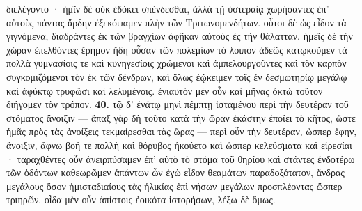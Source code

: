 \documentclass[a4paper, 11pt, oneside, polutonikogreek, german]{article}
\begin{document}
διελέγοντο · ἡμῖν δὲ οὐκ ἐδόκει σπένδεσθαι, ἀλλὰ τῇ ὑστεραίᾳ χωρήσαντες ἐπ' αὐτοὺς πάντας ἄρδην ἐξεκόψαμεν πλὴν τῶν Τριτωνομενδήτων. οὗτοι δὲ ὡς εἶδον τὰ γιγνόμενα, διαδράντες ἐκ τῶν βραγχίων ἀφῆκαν αὑτοὺς ἐς τὴν θάλατταν. ἡμεῖς δὲ τὴν χώραν ἐπελθόντες ἔρημον ἤδη οὖσαν τῶν πολεμίων τὸ λοιπὸν ἀδεῶς κατῳκοῦμεν τὰ πολλὰ γυμνασίοις τε καὶ κυνηγεσίοις χρώμενοι καὶ ἀμπελουργοῦντες καὶ τὸν καρπὸν συγκομιζόμενοι τὸν ἐκ τῶν δένδρων, καὶ ὅλως ἐῴκειμεν τοῖς ἐν δεσμωτηρίῳ μεγάλῳ καὶ ἀφύκτῳ τρυφῶσι καὶ λελυμένοις. ἐνιαυτὸν μὲν οὖν καὶ μῆνας ὀκτὼ τοῦτον διήγομεν τὸν τρόπον. \textbf{40.} τῷ δ' ἐνάτῳ μηνὶ πέμπτῃ ἱσταμένου περὶ τὴν δευτέραν τοῦ στόματος ἄνοιξιν --- ἄπαξ γὰρ δὴ τοῦτο κατὰ τὴν ὥραν ἑκάστην ἐποίει τὸ κῆτος, ὥστε ἡμᾶς πρὸς τὰς ἀνοίξεις τεκμαίρεσθαι τὰς ὥρας --- περὶ οὖν τὴν δευτέραν, ὥσπερ ἔφην, ἄνοιξιν, ἄφνω βοή τε πολλὴ καὶ θόρυβος ἠκούετο καὶ ὥσπερ κελεύσματα καὶ εἰρεσίαι · ταραχθέντες οὖν ἀνειρπύσαμεν ἐπ' αὐτὸ τὸ στόμα τοῦ θηρίου καὶ στάντες ἐνδοτέρω τῶν ὀδόντων καθεωρῶμεν ἁπάντων ὧν ἐγὼ εἶδον θεαμάτων παραδοξότατον, ἄνδρας μεγάλους ὅσον ἡμισταδιαίους τὰς ἡλικίας ἐπὶ νήσων μεγάλων προσπλέοντας ὥσπερ τριηρῶν. οἶδα μὲν οὖν ἀπίστοις ἐοικότα ἱστορήσων, λέξω δὲ ὅμως.
\end{document}
